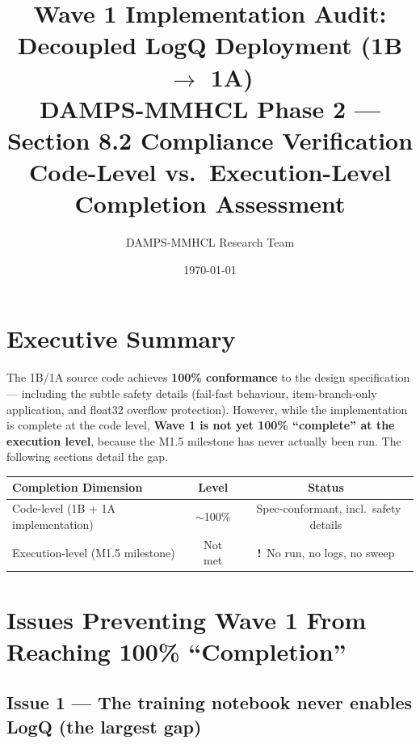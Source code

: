 \documentclass[11pt, a4paper]{article}
\title{%
  \textbf{Wave 1 Implementation Audit: Decoupled LogQ Deployment (1B $\rightarrow$ 1A)}\\[0.4em]
  \large DAMPS-MMHCL Phase 2 --- Section 8.2 Compliance Verification\\[0.2em]
  \normalsize Code-Level vs.\ Execution-Level Completion Assessment
}
\author{DAMPS-MMHCL Research Team}
\date{\today}
\newcommand{\cmark}{\textcolor{green!60!black}{\textbf{\checkmark}}}
\newcommand{\warnmark}{\textcolor{orange!80!black}{\textbf{!}}}
\begin{document}

\maketitle
\tableofcontents
\newpage

\section{Executive Summary}

The 1B/1A source code achieves \textbf{100\% conformance} to the design
specification --- including the subtle safety details (fail-fast behaviour,
item-branch-only application, and float32 overflow protection). However, while the
implementation is complete at the code level, \textbf{Wave 1 is not yet 100\%
``complete'' at the execution level}, because the M1.5 milestone has never actually
been run. The following sections detail the gap.

\begin{center}
\renewcommand{\arraystretch}{1.4}
\begin{tabular}{lcc}
\toprule
\textbf{Completion Dimension} & \textbf{Level} & \textbf{Status} \\
\midrule
\cellcolor{passgreen}Code-level (1B + 1A implementation) & $\sim$100\% &
  \cmark~Spec-conformant, incl.\ safety details \\
\cellcolor{warnred}Execution-level (M1.5 milestone) & Not met &
  \warnmark~No run, no logs, no sweep \\
\bottomrule
\end{tabular}
\end{center}

\section{Issues Preventing Wave 1 From Reaching 100\% ``Completion''}

\subsection{Issue 1 --- The training notebook never enables LogQ (the largest gap)}
\end{document}
